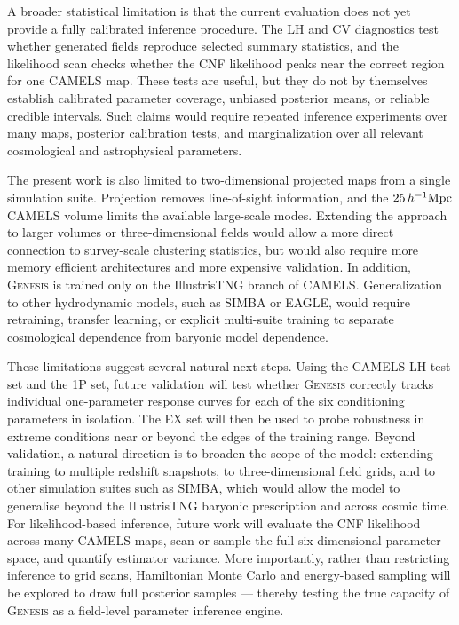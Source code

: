 \documentclass[usenatbib]{mnras}
\begin{document}
A broader statistical limitation is that the current evaluation does
not yet provide a fully calibrated inference procedure. The LH and CV
diagnostics test whether generated fields reproduce selected summary
statistics, and the likelihood scan checks whether the CNF likelihood
peaks near the correct region for one CAMELS map. These tests are
useful, but they do not by themselves establish calibrated parameter
coverage, unbiased posterior means, or reliable credible intervals.
Such claims would require repeated inference experiments over many
maps, posterior calibration tests, and marginalization over all relevant
cosmological and astrophysical parameters.

The present work is also limited to two-dimensional projected maps
from a single simulation suite. Projection removes line-of-sight
information, and the $25\,h^{-1}{\rm Mpc}$ CAMELS volume limits the
available large-scale modes. Extending the approach to larger volumes
or three-dimensional fields would allow a more direct connection to
survey-scale clustering statistics, but would also require more memory
efficient architectures and more expensive validation. In addition,
\textsc{Genesis} is trained only on the IllustrisTNG branch of CAMELS.
Generalization to other hydrodynamic models, such as SIMBA or EAGLE,
would require retraining, transfer learning, or explicit multi-suite
training to separate cosmological dependence from baryonic model
dependence.

These limitations suggest several natural next steps. Using the CAMELS
LH test set and the 1P set, future validation will test whether
\textsc{Genesis} correctly tracks individual one-parameter response
curves for each of the six conditioning parameters in isolation. The EX set will then be
used to probe robustness in extreme conditions near or beyond the
edges of the training range. Beyond validation, a natural direction is
to broaden the scope of the model: extending training to multiple
redshift snapshots, to three-dimensional field grids, and to other
simulation suites such as SIMBA, which would allow the model to
generalise beyond the IllustrisTNG baryonic prescription and across
cosmic time. For likelihood-based inference, future work will evaluate
the CNF likelihood across many CAMELS maps, scan or sample the full
six-dimensional parameter space, and quantify estimator variance.
More importantly, rather than restricting inference to grid scans,
Hamiltonian Monte Carlo and energy-based sampling will be explored
to draw full posterior samples --- thereby testing the true capacity
of \textsc{Genesis} as a field-level parameter inference engine.
\end{document}
